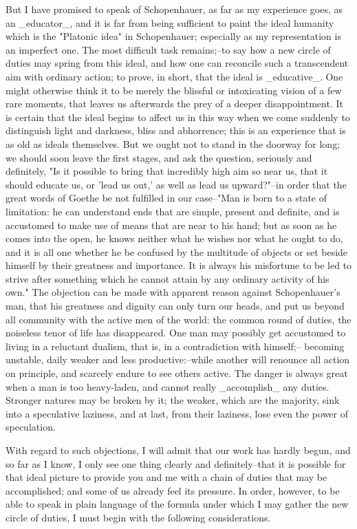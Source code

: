 But I have promised to speak of Schopenhauer, as far as my experience
goes, as an _educator_, and it is far from being sufficient to paint
the ideal humanity which is the "Platonic idea" in Schopenhauer;
especially as my representation is an imperfect one. The most
difficult task remains;--to say how a new circle of duties may spring
from this ideal, and how one can reconcile such a transcendent aim
with ordinary action; to prove, in short, that the ideal is
_educative_. One might otherwise think it to be merely the blissful
or intoxicating vision of a few rare moments, that leaves us
afterwards the prey of a deeper disappointment. It is certain that
the ideal begins to affect us in this way when we come suddenly to
distinguish light and darkness, bliss and abhorrence; this is an
experience that is as old as ideals themselves. But we ought not to
stand in the doorway for long; we should soon leave the first stages,
and ask the question, seriously and definitely, "Is it possible to
bring that incredibly high aim so near us, that it should educate us,
or 'lead us out,' as well as lead us upward?"--in order that the
great words of Goethe be not fulfilled in our case--"Man is born to a
state of limitation: he can understand ends that are simple, present
and definite, and is accustomed to make use of means that are near to
his hand; but as soon as he comes into the open, he knows neither
what he wishes nor what he ought to do, and it is all one whether he
be confused by the multitude of objects or set beside himself by
their greatness and importance. It is always his misfortune to be led
to strive after something which he cannot attain by any ordinary
activity of his own." The objection can be made with apparent reason
against Schopenhauer's man, that his greatness and dignity can only
turn our heads, and put us beyond all community with the active men
of the world: the common round of duties, the noiseless tenor of life
has disappeared. One man may possibly get accustomed to living in a
reluctant dualism, that is, in a contradiction with himself;--
becoming unstable, daily weaker and less productive:--while another
will renounce all action on principle, and scarcely endure to see
others active. The danger is always great when a man is too
heavy-laden, and cannot really _accomplish_ any duties. Stronger
natures may be broken by it; the weaker, which are the majority, sink
into a speculative laziness, and at last, from their laziness, lose
even the power of speculation.

With regard to such objections, I will admit that our work has hardly
begun, and so far as I know, I only see one thing clearly and
definitely--that it is possible for that ideal picture to provide you
and me with a chain of duties that may be accomplished; and some of
us already feel its pressure. In order, however, to be able to speak
in plain language of the formula under which I may gather the new
circle of duties, I must begin with the following considerations.

